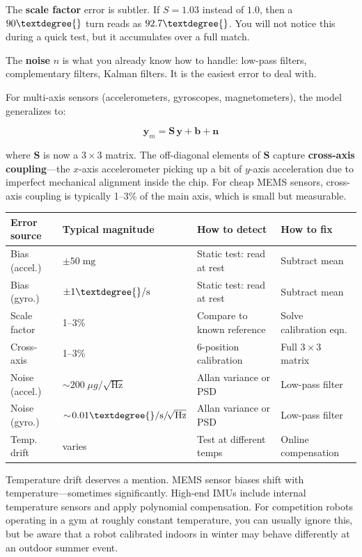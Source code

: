 The \textbf{scale factor} error is subtler. If $S = 1.03$ instead of $1.0$, then a $90\textdegree{}$ turn reads as $92.7\textdegree{}$. You will not notice this during a quick test, but it accumulates over a full match.

The \textbf{noise} $n$ is what you already know how to handle: low-pass filters, complementary filters, Kalman filters. It is the easiest error to deal with.

For multi-axis sensors (accelerometers, gyroscopes, magnetometers), the model generalizes to:

\begin{equation}
\mathbf{y}_m = \mathbf{S} \, \mathbf{y} + \mathbf{b} + \mathbf{n}
\end{equation}

where $\mathbf{S}$ is now a $3 \times 3$ matrix. The off-diagonal elements of $\mathbf{S}$ capture \textbf{cross-axis coupling}---the $x$-axis accelerometer picking up a bit of $y$-axis acceleration due to imperfect mechanical alignment inside the chip. For cheap MEMS sensors, cross-axis coupling is typically 1--3\% of the main axis, which is small but measurable.

\begin{center}
\begin{tabular}{llll}
\toprule
\textbf{Error source} & \textbf{Typical magnitude} & \textbf{How to detect} & \textbf{How to fix} \\
\midrule
Bias (accel.) & $\pm 50\;\mathrm{mg}$ & Static test: read at rest & Subtract mean \\
Bias (gyro.) & $\pm 1\textdegree{}/\mathrm{s}$ & Static test: read at rest & Subtract mean \\
Scale factor & 1--3\% & Compare to known reference & Solve calibration eqn. \\
Cross-axis & 1--3\% & 6-position calibration & Full $3\times3$ matrix \\
Noise (accel.) & $\sim\!200\;\mu g/\!\sqrt{\mathrm{Hz}}$ & Allan variance or PSD & Low-pass filter \\
Noise (gyro.) & $\sim\!0.01\textdegree{}/\mathrm{s}/\!\sqrt{\mathrm{Hz}}$ & Allan variance or PSD & Low-pass filter \\
Temp. drift & varies & Test at different temps & Online compensation \\
\bottomrule
\end{tabular}
\end{center}

Temperature drift deserves a mention. MEMS sensor biases shift with temperature---sometimes significantly. High-end IMUs include internal temperature sensors and apply polynomial compensation. For competition robots operating in a gym at roughly constant temperature, you can usually ignore this, but be aware that a robot calibrated indoors in winter may behave differently at an outdoor summer event.

